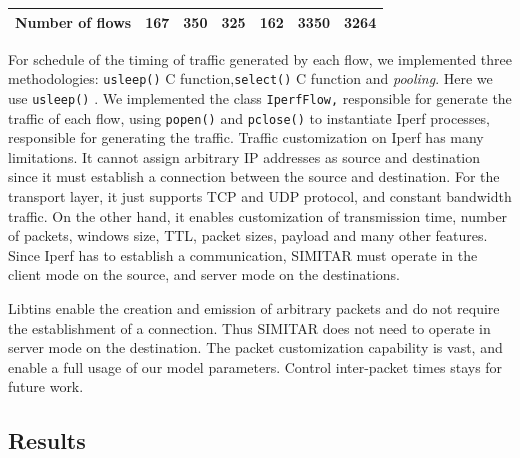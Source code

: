 \begin{table}[h]
\begin{tabular}{lcccccc}
	Number of flows                       & 167                         & 350                                                                                                      & 325                                                                                                   & 162                                                                                                        & 3350                         & 3264                                                                                                        \\ \hline
\end{tabular}
\end{table}

For schedule of the timing of traffic generated by each flow, we implemented three methodologies: \texttt{usleep()} C function,\texttt{select()} C function and \textit{pooling}. Here we use \texttt{usleep()} . We implemented the class \texttt{IperfFlow,} responsible for generate the traffic of each flow, using \texttt{popen()} and \texttt{pclose()} to instantiate Iperf processes, responsible for generating the traffic. Traffic customization on Iperf has many limitations. It cannot assign arbitrary IP addresses as source and destination since it must establish a connection between the source and destination. For the transport layer, it just supports TCP and UDP protocol, and constant bandwidth traffic. On the other hand, it enables customization of transmission time, number of packets, windows size, TTL, packet sizes, payload and many other features. Since Iperf has to establish a communication, SIMITAR must operate in the client mode on the source, and server mode on the destinations.

Libtins enable the creation and emission of arbitrary packets and do not require the establishment of a connection.  Thus SIMITAR does not need to operate in server mode on the destination. The packet customization capability is vast, and enable a full usage of our model parameters. Control inter-packet times stays for future work. 

\subsection{Results}



